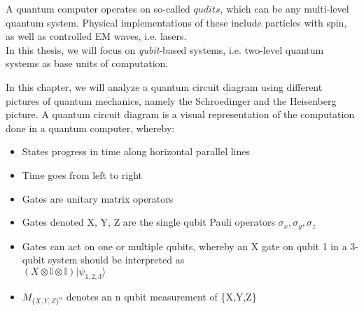 A quantum computer operates on so-called $qudits$, which can be
any multi-level quantum system. 
Physical implementations of these include particles with 
spin, as well as controlled EM waves, i.e. lasers. \\
In this thesis, we will
focus on \emph{qubit}-based systems, i.e. two-level quantum systems as base 
units of computation.

In this chapter, we will analyze a quantum circuit diagram using different
pictures of quantum mechanics, namely the Schroedinger and the Heisenberg picture.
A quantum circuit diagram is a visual representation of the computation done
in a quantum computer, whereby:
\begin{itemize}
	\item States progress in time along horizontal parallel lines
	\item Time goes from left to right
	\item Gates are unitary matrix operators
	\item Gates denoted X, Y, Z are the single qubit Pauli operators
		$\sigma_x,\sigma_y,\sigma_z$
	\item Gates can act on one or multiple qubits, whereby an X gate 
		on qubit 1 in a 3-qubit system should be interpreted as
		\\$(X\otimes \mathbb{I} \otimes \mathbb{I}) |\psi_{1,2,3}\rangle$
    \item $M_{\{X,Y,Z\}^n}$ denotes an n qubit measurement of \{X,Y,Z\} 
\end{itemize}




\newpage
